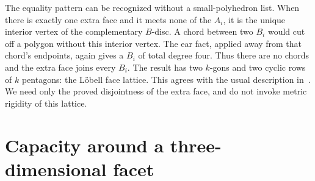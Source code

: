 \documentclass[11pt]{article}
\theoremstyle{remark}
\begin{document}
The equality pattern can be recognized without a small-polyhedron list.
When there is exactly one extra face and it meets none of the $A_i$,
it is the unique interior vertex of the complementary $B$-disc. A chord
between two $B_i$ would cut off a polygon without this interior vertex.
The ear fact, applied away from that chord's endpoints, again gives a
$B_i$ of total degree four. Thus there are no chords and the extra face
joins every $B_i$. The result has two $k$-gons and two cyclic rows of
$k$ pentagons: the L\"obell face lattice. This agrees with the usual
description in~\cite[p.~17 of the author's version]{KK}. We need only
the proved disjointness of the extra face, and do not invoke metric
rigidity of this lattice.

\section{Capacity around a three-dimensional facet}
\end{document}
